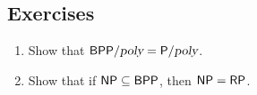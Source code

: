 \subsection*{Exercises}
\newcommand{\BPPpoly}{\BPP/\poly}
\begin{enumerate}
\item Show that $\BPPpoly = \Ppoly$. %
\item Show that if ${\mathsf{NP}} \subseteq {\ensuremath{\mathsf{BPP}}}$, then ${\mathsf{NP}} = {\mathsf{RP}}$. %
\end{enumerate}